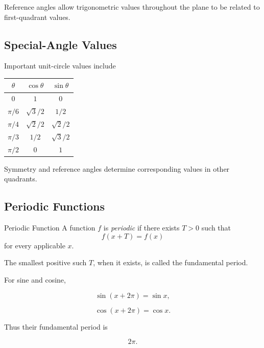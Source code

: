 Reference angles allow trigonometric values throughout the plane to be
related to first-quadrant values.

\subsection{Special-Angle Values}
\label{subsec:special-angle-values}

Important unit-circle values include

\begin{center}
\begin{tabular}{c|cc}
\toprule
\(\theta\) & \(\cos\theta\) & \(\sin\theta\)\\
\midrule
\(0\) & \(1\) & \(0\)\\
\(\pi/6\) & \(\sqrt3/2\) & \(1/2\)\\
\(\pi/4\) & \(\sqrt2/2\) & \(\sqrt2/2\)\\
\(\pi/3\) & \(1/2\) & \(\sqrt3/2\)\\
\(\pi/2\) & \(0\) & \(1\)\\
\bottomrule
\end{tabular}
\end{center}

Symmetry and reference angles determine corresponding values in other
quadrants.

\subsection{Periodic Functions}
\label{subsec:periodic-functions}

\begin{definitionbox}{Periodic Function}
A function \(f\) is \emph{periodic} if there exists \(T>0\) such that
\[ f(x+T)=f(x) \]
for every applicable \(x\).
\end{definitionbox}

The smallest positive such \(T\), when it exists, is called the fundamental
period.

For sine and cosine,

\[ \sin(x+2\pi)=\sin x, \]

\[ \cos(x+2\pi)=\cos x. \]

Thus their fundamental period is

\[ 2\pi. \]

